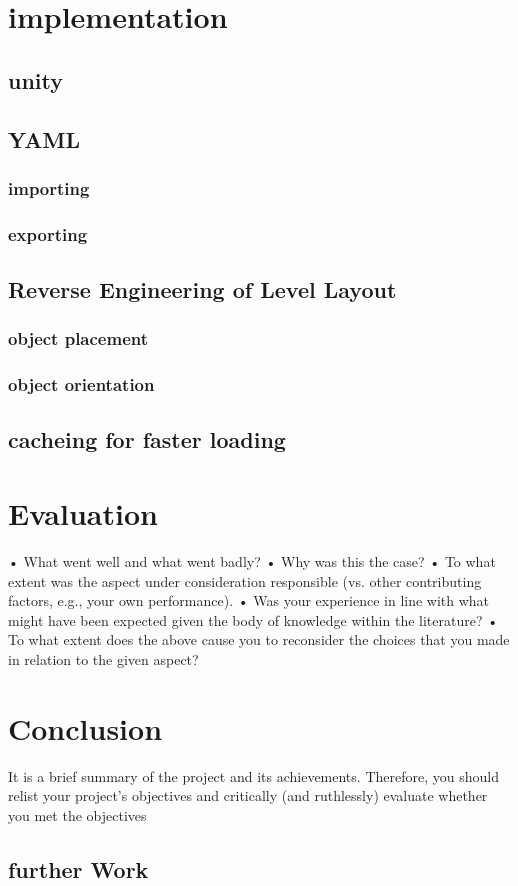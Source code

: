 
\section{implementation}
\subsection{unity}

\subsection{YAML}
\subsubsection{importing}
\subsubsection{exporting}

\subsection{Reverse Engineering of Level Layout}
\subsubsection{object placement}
\subsubsection{object orientation}

\subsection{cacheing for faster loading}

\section{Evaluation}
•	What went well and what went badly?  
•	Why was this the case?  
•	To what extent was the aspect under consideration responsible (vs. other contributing factors, e.g., your own performance).
•	Was your experience in line with what might have been expected given the body of knowledge within the literature?
•	To what extent does the above cause you to reconsider the choices that you made in relation to the given aspect?

\section{Conclusion}
It is a brief summary of the project and its achievements. Therefore, you should relist your project’s objectives and critically (and ruthlessly) evaluate whether you met the objectives
\subsection{further Work}

